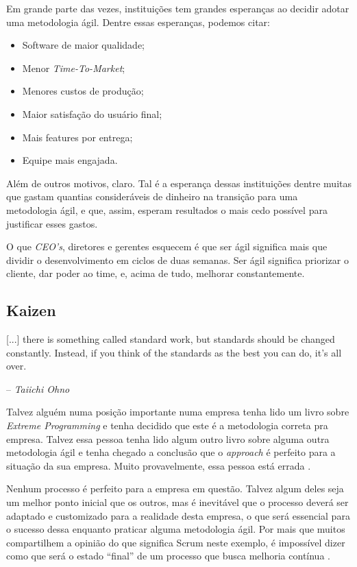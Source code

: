 \documentclass{iiufrgs}
\begin{document}
Em grande parte das vezes, instituições tem grandes esperanças ao decidir adotar uma metodologia ágil. Dentre essas esperanças, podemos citar:

\begin{itemize}[leftmargin=3em, noitemsep, nosep, before=\vspace{1cm}, after=\vspace{1cm}]
    \setlength{\itemindent}{1em}
    \item Software de maior qualidade;
    \item Menor \textit{Time-To-Market};
    \item Menores custos de produção; 
    \item Maior satisfação do usuário final; 
    \item Mais features por entrega;
    \item Equipe mais engajada.
\end{itemize}

Além de outros motivos, claro. Tal é a esperança dessas instituições dentre muitas que gastam quantias consideráveis de dinheiro na transição para uma metodologia ágil, e que, assim, esperam resultados o mais cedo possível para justificar esses gastos.

O que \textit{CEO's}, diretores e gerentes esquecem é que ser ágil significa mais que dividir o desenvolvimento em ciclos de duas semanas. Ser ágil significa priorizar o cliente, dar poder ao time, e, acima de tudo, melhorar constantemente.

\subsection{Kaizen}\label{kaizen}

\epigraph{[...] there is something called standard work, but standards should be changed constantly. Instead, if you think of the standards as the best you can do, it's all over.}{-- \textit{Taiichi Ohno}}

Talvez alguém numa posição importante numa empresa tenha lido um livro sobre \textit{Extreme Programming} e tenha decidido que este é a metodologia correta pra empresa. Talvez essa pessoa tenha lido algum outro livro sobre alguma outra metodologia ágil e tenha chegado a conclusão que o \textit{approach} é perfeito para a situação da sua empresa. Muito provavelmente, essa pessoa está errada \cite{Cohn2009Succeeding}.

Nenhum processo é perfeito para a empresa em questão. Talvez algum deles seja um melhor ponto inicial que os outros, mas é inevitável que o processo deverá ser adaptado e customizado para a realidade desta empresa, o que será essencial para o sucesso dessa enquanto praticar alguma metodologia ágil. Por mais que muitos compartilhem a opinião do que significa Scrum neste exemplo, é impossível dizer como que será o estado \enquote{final} de um processo que busca melhoria contínua \cite{Cohn2009Succeeding}.
\end{document}
